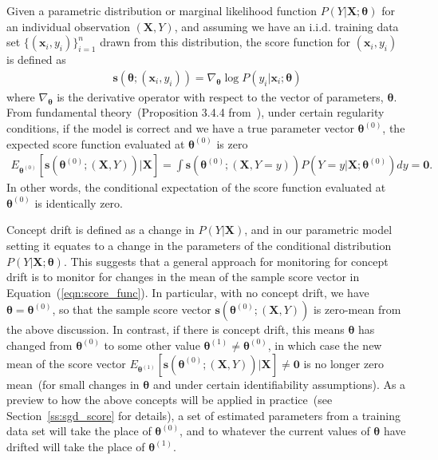 \documentclass[twoside,11pt]{article}
\begin{document}
Given a parametric distribution or {marginal} likelihood function {$P(Y | \bm {X}; \bm{\theta})$} for an individual observation $(\bm{X}, Y)$, and assuming we have an i.i.d. training data set $\{(\bm {x}_i, y_i)\}_{i=1}^n$ drawn from this distribution, the score function for $ (\bm {x}_i, y_i)$ is defined as 
\begin{align}
\bm{s}(\bm { \theta}; (\bm {x}_i, y_i)) = \nabla _{\bm { \theta}} { \log{P(y_i | \bm {x}_i; \bm{\theta})}}
\label{eqn:score_func}
\end{align}
where $\nabla _{\bm { \theta}}$ is the derivative operator with respect to the vector of parameters, $\bm {\theta}$. From fundamental theory~(Proposition 3.4.4 from~\cite{bickel2015mathematical}), under certain regularity conditions, if the model is correct and we have a true parameter vector {$\bm { \theta} ^{ (0)}$}, the expected score function evaluated at $\bm { \theta} ^{ (0)}$ is zero
\begin{align}
E_{\bm { \theta} ^{ (0)}}[\bm{s}(\bm { \theta}^{ (0)};(\bm {X}, Y))|\bm {X}] = \int\bm{s}(\bm { \theta}^{ (0)};(\bm {X}, Y=y))P(Y=y|\bm{X};\bm{\theta}^{(0)})dy = \bm{0}.
\label{eqn:score_exp_zero}
\end{align}
In other words, the conditional expectation of the score function evaluated at $\bm { \theta} ^{ (0)}$ is identically zero.

Concept drift is defined as a change in $ P (Y|\bm {X})$, and in our parametric model setting it equates to a change in the parameters of the conditional distribution $P(Y|\bm {X}; \bm { \theta})$. This suggests that a general approach for monitoring for concept drift is to monitor for changes in the mean of the sample score vector in Equation~(\ref{eqn:score_func}). In particular, with no concept drift, we have $\bm{\theta}=\bm{\theta}^{(0)}$, so that the sample score vector $\bm{s}(\bm { \theta}^{ (0)};(\bm {X}, Y))$ is zero-mean from the above discussion. In contrast, if there is concept drift, this means $\bm{\theta}$ has changed from $\bm{\theta}^{(0)}$ to some other value $\bm{\theta}^{(1)} \neq \bm{\theta}^{(0)}$, in which case the new mean of the score vector $E_{\bm { \theta} ^{ (1)}}[\bm{s}(\bm { \theta}^{ (0)};(\bm {X}, Y))|\bm {X}] \neq \bm{0}$ is no longer zero mean~(for small changes in $\bm{\theta}$ and under certain identifiability assumptions). As a preview to how the above concepts will be applied in practice~(see Section~\ref{ss:sgd_score} for details), a set of estimated parameters from a training data set will take the place of $\bm { \theta}^{ (0)}$, and to whatever the current values of $\bm{\theta}$ have drifted will take the place of $\bm{\theta}^{(1)}$.
\end{document}
